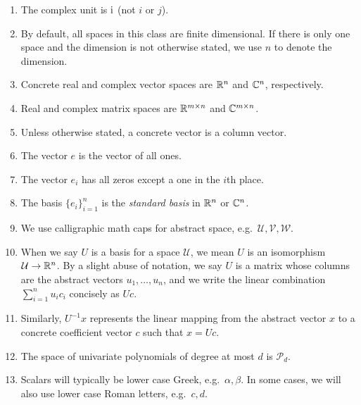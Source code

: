 \documentclass[12pt, leqno]{article}
\begin{document}
\begin{enumerate}
\item
  The complex unit is $\mathrm{i}$ (not $i$ or $j$).

\item
  By default, all spaces in this class are finite dimensional. If there
  is only one space and the dimension is not otherwise stated, we use
  $n$ to denote the dimension.

\item
  Concrete real and complex vector spaces are $\mathbb{R}^n$ and $\mathbb{C}^n$,
  respectively.

\item
  Real and complex matrix spaces are $\mathbb{R}^{m\times n}$ and $\mathbb{C}^{m
  \times n}$.

\item Unless otherwise stated, a concrete vector is a column vector.

\item The vector $e$ is the vector of all ones.

\item The vector $e_i$ has all zeros except a one in the $i$th place.

\item
  The basis $\{ e_i \}_{i=1}^n$ is the {\em standard basis} in $\mathbb{R}^n$
  or $\mathbb{C}^n$.

\item
  We use calligraphic math caps for abstract space,
  e.g.~$\mathcal{U}, \mathcal{V}, \mathcal{W}$.

\item
   When we say $U$ is a basis for a space $\mathcal{U}$, we mean $U$ is
   an isomorphism $\mathcal{U} \rightarrow \mathbb{R}^n$.  By a slight abuse
   of notation, we say $U$ is a matrix whose columns are the abstract
   vectors $u_1, \ldots, u_n$, and we write the linear combination
   $\sum_{i=1}^n u_i c_i$ concisely as $Uc$.

\item
  Similarly, $U^{-1} x$ represents the linear mapping from the
  abstract vector $x$ to a concrete coefficient vector $c$ such
  that $x = Uc$.

\item The space of univariate polynomials of degree at most
  $d$ is $\mathcal{P}_d$.

\item
  Scalars will typically be lower case Greek, e.g.~$\alpha, \beta$. In
  some cases, we will also use lower case Roman letters, e.g.~$c, d$.


\end{enumerate}
\end{document}
